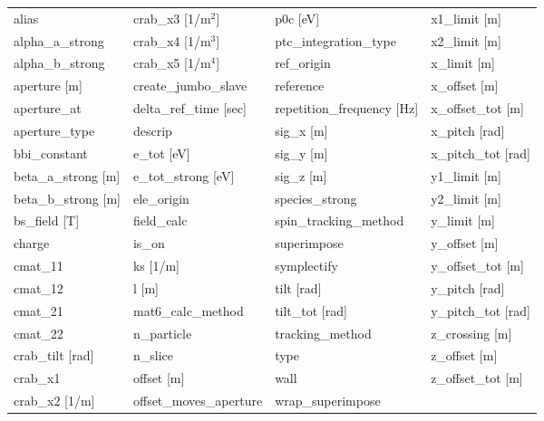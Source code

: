 \begin{tabular}{llll} \toprule
alias                            & crab_x3 [1/m$^2$]                & p0c [eV]                         & x1_limit [m]                     \\
alpha_a_strong                   & crab_x4 [1/m$^3$]                & ptc_integration_type             & x2_limit [m]                     \\
alpha_b_strong                   & crab_x5 [1/m$^4$]                & ref_origin                       & x_limit [m]                      \\
aperture [m]                     & create_jumbo_slave               & reference                        & x_offset [m]                     \\
aperture_at                      & delta_ref_time [sec]             & repetition_frequency [Hz]        & x_offset_tot [m]                 \\
aperture_type                    & descrip                          & sig_x [m]                        & x_pitch [rad]                    \\
bbi_constant                     & e_tot [eV]                       & sig_y [m]                        & x_pitch_tot [rad]                \\
beta_a_strong [m]                & e_tot_strong [eV]                & sig_z [m]                        & y1_limit [m]                     \\
beta_b_strong [m]                & ele_origin                       & species_strong                   & y2_limit [m]                     \\
bs_field [T]                     & field_calc                       & spin_tracking_method             & y_limit [m]                      \\
charge                           & is_on                            & superimpose                      & y_offset [m]                     \\
cmat_11                          & ks [1/m]                         & symplectify                      & y_offset_tot [m]                 \\
cmat_12                          & l [m]                            & tilt [rad]                       & y_pitch [rad]                    \\
cmat_21                          & mat6_calc_method                 & tilt_tot [rad]                   & y_pitch_tot [rad]                \\
cmat_22                          & n_particle                       & tracking_method                  & z_crossing [m]                   \\
crab_tilt [rad]                  & n_slice                          & type                             & z_offset [m]                     \\
crab_x1                          & offset [m]                       & wall                             & z_offset_tot [m]                 \\
crab_x2 [1/m]                    & offset_moves_aperture            & wrap_superimpose                 &                                  \\
 \bottomrule
 \end{tabular}
